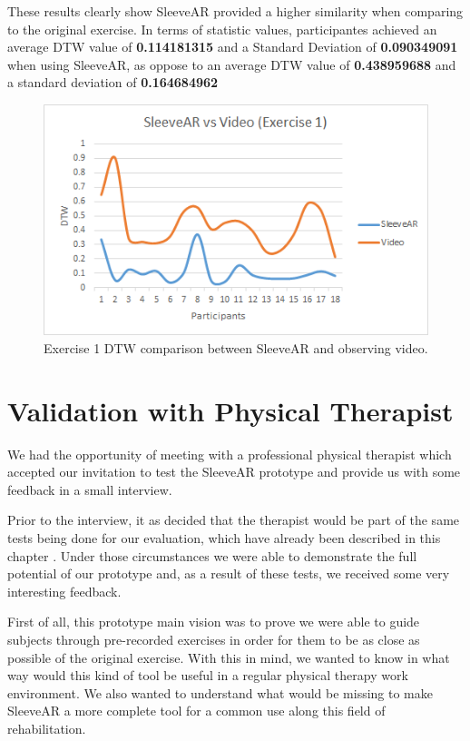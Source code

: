 These results clearly show SleeveAR provided a higher similarity when comparing to the original exercise. In terms of statistic values, participantes achieved an average \ac{DTW} value of \textbf{0.114181315} and a Standard Deviation of \textbf{0.090349091} when using SleeveAR, as oppose to an average \ac{DTW} value of \textbf{0.438959688} and a standard deviation of \textbf{0.164684962}

\begin{figure}[t!]
    \centering
    \includegraphics{imgs/results/sleevearVSvideoEx1.png}
    \caption{Exercise 1 DTW comparison between SleeveAR and observing video.}
    \label{fig:sleevearVSvideoEx1}
\end{figure}

\section{Validation with Physical Therapist}

We had the opportunity of meeting with a professional physical therapist which accepted our invitation to test the SleeveAR prototype and provide us with some feedback in a small interview.

Prior to the interview, it as decided that the therapist would be part of the same tests being done for our evaluation, which have already been described in this chapter . Under those circumstances we were able to demonstrate the full potential of our prototype and, as a result of these tests, we received some very interesting feedback.

First of all, this prototype main vision was to prove we were able to guide subjects through pre-recorded exercises in order for them to be as close as possible of the original exercise. With this in mind, we wanted to know in what way would this kind of tool be useful in a regular physical therapy work environment. We also wanted to understand what would be missing to make SleeveAR a more complete tool for a common use along this field of rehabilitation.

